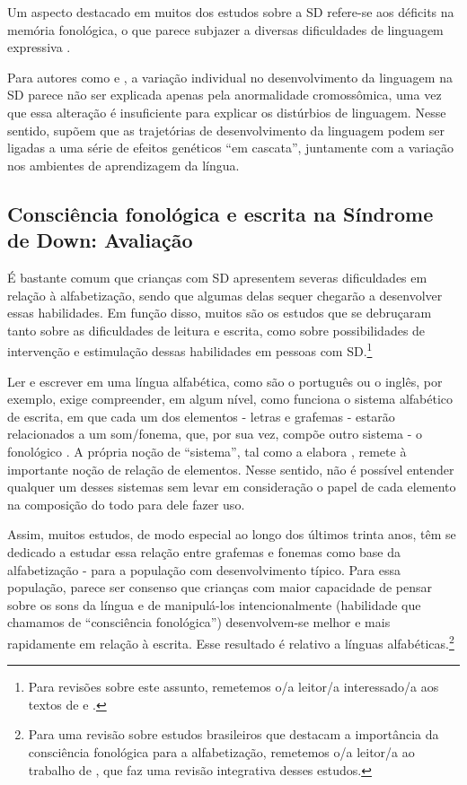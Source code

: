 \documentclass[output=paper,colorlinks,citecolor=brown,booklanguage=portuguese]{langscibook}
\begin{document}
Um aspecto destacado em muitos dos estudos sobre a SD refere-se aos déficits na memória fonológica, o que parece subjazer a diversas dificuldades de linguagem expressiva \citep{Chapman2001, KarmiloffSmith2016}.

Para autores como \citet{KarmiloffSmith1998, Chapman2001, Laws2004} e \citet{KarmiloffSmith2016}, a variação individual no desenvolvimento da linguagem na SD parece não ser explicada apenas pela anormalidade cromossômica, uma vez que essa alteração é insuficiente para explicar os distúrbios de linguagem. Nesse sentido, supõem que as trajetórias de desenvolvimento da linguagem podem ser ligadas a uma série de efeitos genéticos “em cascata”, juntamente com a variação nos ambientes de aprendizagem da língua.

\subsection{Consciência fonológica e escrita na Síndrome de Down: Avaliação}

É bastante comum que crianças com SD apresentem severas dificuldades em relação à alfabetização, sendo que algumas delas sequer chegarão a desenvolver essas habilidades. Em função disso, muitos são os estudos que se debruçaram tanto sobre as dificuldades de leitura e escrita, como sobre possibilidades de intervenção e estimulação dessas habilidades em pessoas com SD.\footnote{Para revisões sobre este assunto, remetemos o/a leitor/a interessado/a aos textos de \citet{Lorandi2019} e \citet{Marques2018}.}

Ler e escrever em uma língua alfabética, como são o português ou o inglês, por exemplo, exige compreender, em algum nível, como funciona o sistema alfabético de escrita, em que cada um dos elementos - letras e grafemas - estarão relacionados a um som/fonema, que, por sua vez, compõe outro sistema - o fonológico \citep{Soares2017, Lorandi2021}. A própria noção de “sistema”, tal como a elabora \citet{Saussure[1916]1969}, remete à importante noção de relação de elementos. Nesse sentido, não é possível entender qualquer um desses sistemas sem levar em consideração o papel de cada elemento na composição do todo para dele fazer uso.

Assim, muitos estudos, de modo especial ao longo dos últimos trinta anos, têm se dedicado a estudar essa relação entre grafemas e fonemas como base da alfabetização - para a população com desenvolvimento típico. Para essa população, parece ser consenso que crianças com maior capacidade de pensar sobre os sons da língua e de manipulá-los intencionalmente (habilidade que chamamos de “consciência fonológica”) desenvolvem-se melhor e mais rapidamente em relação à escrita. Esse resultado é relativo a línguas alfabéticas.\footnote{Para uma revisão sobre estudos brasileiros que destacam a importância da consciência fonológica para a alfabetização, remetemos o/a leitor/a ao trabalho de \citet{Konrad2019}, que faz uma revisão integrativa desses estudos.} 
\end{document}
